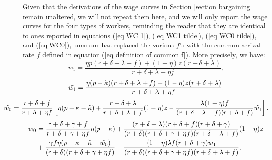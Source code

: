 \documentclass[12pt]{article} %
\theoremstyle{definition}
\begin{document}
Given that the derivations of the wage curves in Section \ref{section bargaining} remain unaltered, we will not repeat them here, and we will only report the wage curves for the four types of workers, reminding the reader that they are identical to ones reported in equations (\ref{eq WC 1}), (\ref{eq WC1 tilde}), (\ref{eq WC0 tilde}), and (\ref{eq WC0}), once one has replaced the various $f$'s with the common arrival rate $f$ defined in equation (\ref{eq definition of common f}). More precisely, we have:    
\begin{equation}
 w_1 = \frac{\eta p (r+\delta+\lambda+f)+(1-\eta)z(r+\delta+\lambda)}{r+\delta+\lambda + \eta f},  \label{eq WC1 inter 1}
\end{equation}
\begin{equation}
\Tilde{w_1} = \frac{\eta (p-\Tilde{\kappa}) (r+\delta+\lambda+f)+(1-\eta)z(r+\delta+\lambda)}{r+\delta+\lambda + \eta f},  \label{eq WC1 tilde inter 1}
\end{equation}
\begin{equation} \label{eq WC0 tilde inter 1}
\hspace{-1cm}\Tilde{w_0}  = \frac{r+\delta+ f}{r+\delta+\eta {f}} 
\left[\eta(p-\kappa-\Tilde{\kappa}) +\frac{r+\delta+\lambda}{r+\delta+\lambda+f}(1-\eta)z - \frac{\lambda(1-\eta){f}}{(r+\delta+\lambda+f)(r+\delta+ f)}\Tilde{w_1} \right],
\end{equation}
\begin{equation} \label{eq WC0 inter 1}
\begin{split}
 w_0  & = \frac{r+\delta+\gamma +f}{r+\delta+\gamma+\eta f}\eta (p-\kappa) + \frac{(r+\delta+\lambda)(r+\delta+f)(r+\delta+\gamma)}{(r+\delta)(r+\delta+\gamma + \eta f)(r+\delta+\lambda+f)} (1-\eta) z  \\
 & + \frac{\gamma f \eta(p-\kappa-\Tilde{\kappa}-\Tilde{w_0})}{(r+\delta)(r+\delta+\gamma + \eta f)} - \frac{(1-\eta)\lambda f (r+\delta+\gamma)w_1}{(r+\delta)(r+\delta+\gamma + \eta f)(r+\delta+\lambda+f)}.
\end{split}
\end{equation}

\end{document}
